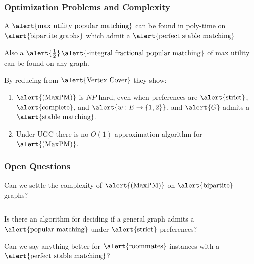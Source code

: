 \documentclass[10pt]{beamer}
\begin{document}
\begin{frame}
\frametitle{Optimization Problems and Complexity}
A $\text{\alert{max utility popular matching}}$ can be found in poly-time on $\text{\alert{bipartite graphs}}$ which admit a $\text{\alert{perfect stable matching}}$

Also a $\alert{\frac{1}{2}}$$\text{\alert{-integral fractional popular matching}}$ of max utility can be found on any graph.

By reducing from $\text{\alert{Vertex Cover}}$ they show:
\begin{enumerate}
\item $\text{\alert{(MaxPM)}}$ is $NP$-hard, even when preferences are $\text{\alert{strict}}$, $\text{\alert{complete}}$, and $\alert{w: E \rightarrow \{1,2\}}$, and $\alert{G}$ admits a $\text{\alert{stable matching}}$.
\item Under UGC there is no $O(1)$-approximation algorithm for $\text{\alert{(MaxPM)}}$.
\end{enumerate}
\end{frame}

\begin{frame}
\frametitle{Open Questions}

Can we settle the complexity of $\text{\alert{(MaxPM)}}$ on $\text{\alert{bipartite}}$ graphs?

$$ $$

Is there an algorithm for deciding if a general graph admits a $\text{\alert{popular matching}}$ under $\text{\alert{strict}}$ preferences?

$$ $$
Can we say anything better for $\text{\alert{roommates}}$ instances with a $\text{\alert{perfect stable matching}}$?
\end{frame}
\end{document}
